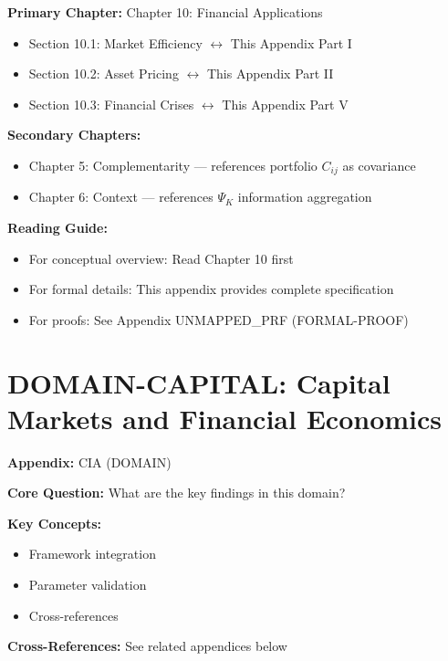 \begin{tcolorbox}[colback=purple!5!white, colframe=purple!75!black,
    title=Chapter Linkage]

\textbf{Primary Chapter:} Chapter 10: Financial Applications
\begin{itemize}[nosep]
\item Section 10.1: Market Efficiency $\leftrightarrow$ This Appendix Part I
\item Section 10.2: Asset Pricing $\leftrightarrow$ This Appendix Part II
\item Section 10.3: Financial Crises $\leftrightarrow$ This Appendix Part V
\end{itemize}

\textbf{Secondary Chapters:}
\begin{itemize}[nosep]
\item Chapter 5: Complementarity --- references portfolio $C_{ij}$ as covariance
\item Chapter 6: Context --- references $\Psi_K$ information aggregation
\end{itemize}

\textbf{Reading Guide:}
\begin{itemize}[nosep]
\item For conceptual overview: Read Chapter 10 first
\item For formal details: This appendix provides complete specification
\item For proofs: See Appendix UNMAPPED_PRF (FORMAL-PROOF)
\end{itemize}

\end{tcolorbox}

\chapter{DOMAIN-CAPITAL: Capital Markets and Financial Economics}
\label{app:capital-markets}

\begin{tcolorbox}[colback=blue!5!white, colframe=blue!75!black,
    title=Quick Reference: Appendix UNMAPPED_CIA]

\textbf{Appendix:} CIA (DOMAIN)

\textbf{Core Question:} What are the key findings in this domain?

\textbf{Key Concepts:}
\begin{itemize}[nosep]
\item Framework integration
\item Parameter validation
\item Cross-references
\end{itemize}

\textbf{Cross-References:} See related appendices below
\end{tcolorbox}

